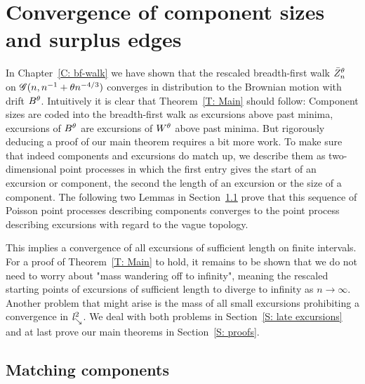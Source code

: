 
\chapter{Convergence of component sizes and surplus edges} \label{C: convergence}


In Chapter~\ref{C: bf-walk} we have shown that the rescaled breadth-first walk $\bar{Z}^{\theta}_n$ on $\mathscr{G}(n, n^{-1} + \theta n^{-4/3})$
converges in distribution to the Brownian motion with drift $B^{\theta}$.
Intuitively it is clear that Theorem~\ref{T: Main} should follow:
Component sizes are coded into the breadth-first walk as excursions above past minima,
excursions of $B^{\theta}$ are excursions of $W^{\theta}$ above past minima.
But rigorously deducing a proof of our main theorem requires a bit more work.
To make sure that indeed components and excursions do match up,
we describe them as two-dimensional point processes
in which the first entry gives the start of an excursion or component, 
the second the length of an excursion or the size of a component.
The following two Lemmas in Section~\ref{S: matching components} prove that this sequence of Poisson point processes describing components 
converges to the point process describing excursions with regard to the vague topology.

This implies a convergence of all excursions of sufficient length on finite intervals.
For a proof of Theorem~\ref{T: Main} to hold, it remains to be shown that we do not need to worry about "mass wandering off to infinity",
meaning the rescaled starting points of excursions of sufficient length to diverge to infinity as $n \rightarrow \infty$.
Another problem that might arise is the mass of all small excursions prohibiting a convergence in $\mathit{l}^2_{\searrow}$.
We deal with both problems in Section~\ref{S: late excursions} and at last prove our main theorems in Section~\ref{S: proofs}.


\section{Matching components} \label{S: matching components}

